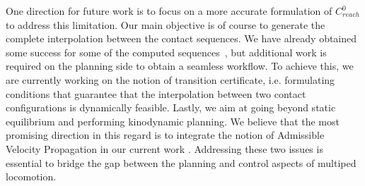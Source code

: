 One direction for future work is to focus on a more accurate formulation of $C_{reach}^0$ to address 
this limitation.
Our main objective is of course to generate the complete interpolation between the contact sequences.
We have already obtained some success for some of the computed sequences~\citep{Carpentier2016}, but additional
work is required on the planning side to obtain a seamless workflow. To achieve this, we are currently working on the notion of transition certificate, i.e. formulating
conditions that guarantee that the interpolation between two contact configurations is dynamically feasible.
Lastly, we aim at going beyond static equilibrium and performing kinodynamic planning. We believe that the most promising direction in this regard is to integrate
the notion of Admissible Velocity Propagation in our current work \citep{DBLP:conf/rss/PhamCN13}.
Addressing these two issues is essential to bridge the gap between the planning and control aspects of multiped locomotion.
